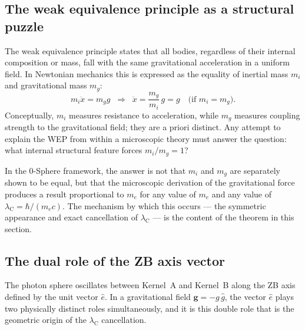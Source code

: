 \documentclass[%
 reprint, amsmath,amssymb, aps, prb, ]{revtex4-2}
\numberwithin{equation}{section}
\newcommand{\lambdaC}{\lambda_{\mathrm{C}}}
\begin{document}
\subsection{The weak equivalence principle as a structural puzzle}
\label{subsec:wep_puzzle}

The weak equivalence principle states that all bodies, regardless of their internal composition or mass, fall with the same gravitational acceleration in a uniform field.
In Newtonian mechanics this is expressed as the equality of inertial mass $m_i$ and gravitational mass $m_g$:
\begin{equation}
m_i \ddot{x} = m_g g
\;\;\Longrightarrow\;\;
\ddot{x} = \frac{m_g}{m_i}\,g = g \quad\text{(if }m_i = m_g\text{)}.
\label{eq:wep_newton}
\end{equation}
Conceptually, $m_i$ measures resistance to acceleration, while $m_g$ measures coupling strength to the gravitational field; they are a priori distinct.
Any attempt to explain the WEP from within a microscopic theory must answer the question: what internal structural feature forces $m_i/m_g = 1$?

In the 0-Sphere framework, the answer is not that $m_i$ and $m_g$ are separately shown to be equal, but that the microscopic derivation of the gravitational force produces a result proportional to $m_e$ for any value of $m_e$ and any value of $\lambdaC = \hbar/(m_e c)$.
The mechanism by which this occurs --- the symmetric appearance and exact cancellation of $\lambdaC$ --- is the content of the theorem in this section.

\subsection{The dual role of the ZB axis vector}
\label{subsec:dual_role}

The photon sphere oscillates between Kernel~A and Kernel~B along the ZB axis defined by the unit vector $\hat{e}$.
In a gravitational field $\mathbf{g} = -g\,\hat{g}$, the vector $\hat{e}$ plays two physically distinct roles simultaneously, and it is this double role that is the geometric origin of the $\lambdaC$ cancellation.
\end{document}
